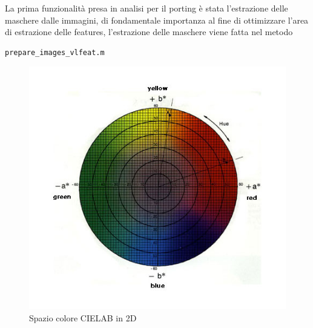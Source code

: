 \documentclass[a4paper,12pt]{report}
\begin{document}
      La prima funzionalità presa in analisi per il porting è stata l'estrazione delle maschere dalle immagini,
      di fondamentale importanza al fine di ottimizzare l'area di estrazione delle features, l'estrazione delle maschere viene fatta
      nel metodo 
      \begin{verbatim}
prepare_images_vlfeat.m
      \end{verbatim}
      \begin{figure}
        \centering
        
        \begin{minipage}{0.35\textwidth}
          \centering
          \includegraphics[width=\textwidth]{assets/images/cielab2.jpg}  
          \caption{Spazio colore CIELAB in 2D}
        \end{minipage}
        \begin{minipage}{0.35\textwidth}
          \centering

\end{minipage}
\end{figure}
\end{document}
